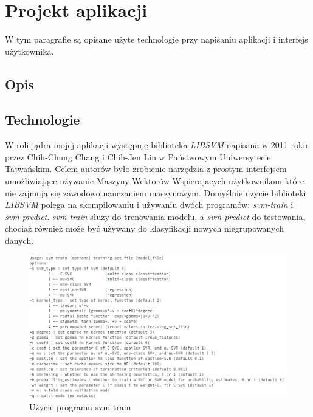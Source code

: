 \documentclass[paper=a4, fontsize=11pt]{scrartcl} %
\numberwithin{equation}{section} %
\numberwithin{figure}{section} %
\begin{document}
\newpage
\section{Projekt aplikacji} %
    \par W tym paragrafie są opisane użyte technologie przy napisaniu aplikacji i interfejs
    użytkownika.

\subsection{Opis}
\subsection{Technologie}
    \par W roli jądra mojej aplikacji występuję biblioteka \textit{LIBSVM} napisana w 2011 roku
    przez Chih-Chung Chang i Chih-Jen Lin w Państwowym Uniwersytecie Tajwańskim. Celem autorów
    było zrobienie narzędzia z prostym interfejsem umożliwiające używanie Maszyny Wektorów
    Wspierajacych użytkownikom które nie zajmują się zawodowo nauczaniem maszynowym. Domyślnie
    użycie biblioteki \textit{LIBSVM} polega na skompilowaniu i używaniu dwóch programów:
    \textit{svm-train} i \textit{svm-predict}. \textit{svm-train} służy do trenowania modelu, 
    a \textit{svm-predict} do testowania, chociaż również może być używany do klasyfikacji
    nowych niegrupowanych danych. 

    \begin{figure}[h]
        \begin{center}
            \includegraphics[scale=0.6]{./img/svm_train_usage.png}
            \caption{Użycie programu svm-train}
            \label{fig:train_usage}
        \end{center}
    \end{figure}
\end{document}
